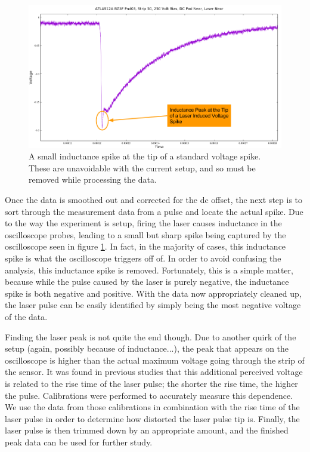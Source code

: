 \documentclass{report}
\begin{document}
            \begin{figure}[h] 
                \includegraphics[height=.4\textheight]{inductance_peak}
                \centering
                \caption{ A small inductance spike at the tip of a standard voltage spike. These are unavoidable with the current setup, and so must be removed while processing the data. }
                \label{fig:inductance_peak}
            \end{figure}

            Once the data is smoothed out and corrected for the dc offset, the next step is to sort through the measurement data from a pulse and locate the actual spike. Due to the way the experiment is setup, firing the laser causes inductance in the oscilloscope probes, leading to a small but sharp spike being captured by the oscilloscope seen in figure \ref{fig:inductance_peak}. In fact, in the majority of cases, this inductance spike is what the oscilloscope triggers off of. In order to avoid confusing the analysis, this inductance spike is removed. Fortunately, this is a simple matter, because while the pulse caused by the laser is purely negative, the inductance spike is both negative and positive. With the data now appropriately cleaned up, the laser pulse can be easily identified by simply being the most negative voltage of the data.

            Finding the laser peak is not quite the end though. Due to another quirk of the setup (again, possibly because of inductance...), the peak that appears on the oscilloscope is higher than the actual maximum voltage going through the strip of the sensor. It was found in previous studies that this additional perceived voltage is related to the rise time of the laser pulse; the shorter the rise time, the higher the pulse. Calibrations were performed to accurately measure this dependence. We use the data from those calibrations in combination with the rise time of the laser pulse in order to determine how distorted the laser pulse tip is. Finally, the laser pulse is then trimmed down by an appropriate amount, and the finished peak data can be used for further study.
\end{document}
